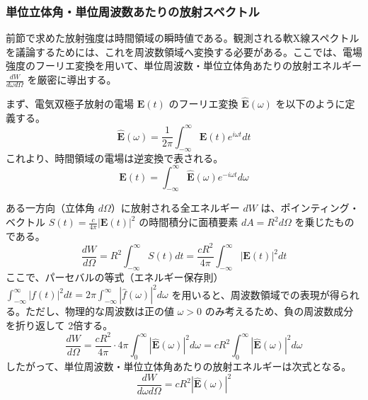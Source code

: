 \documentclass[a4paper,11pt]{bxjsarticle} %
\begin{document}
\subsubsection{単位立体角・単位周波数あたりの放射スペクトル}

前節で求めた放射強度は時間領域の瞬時値である。観測される軟X線スペクトルを議論するためには、これを周波数領域へ変換する必要がある。ここでは、電場強度のフーリエ変換を用いて、単位周波数・単位立体角あたりの放射エネルギー $\frac{dW}{d\omega d\Omega}$ を厳密に導出する。

まず、電気双極子放射の電場 $\bm{E}(t)$ のフーリエ変換 $\hat{\bm{E}}(\omega)$ を以下のように定義する。
\begin{equation}
    \hat{\bm{E}}(\omega) = \frac{1}{2\pi} \int_{-\infty}^{\infty} \bm{E}(t) e^{i\omega t} dt
\end{equation}
これより、時間領域の電場は逆変換で表される。
\begin{equation}
    \bm{E}(t) = \int_{-\infty}^{\infty} \hat{\bm{E}}(\omega) e^{-i\omega t} d\omega
\end{equation}

ある一方向（立体角 $d\Omega$）に放射される全エネルギー $d W$ は、ポインティング・ベクトル $S(t) = \frac{c}{4\pi}|\bm{E}(t)|^2$ の時間積分に面積要素 $dA = R^2 d\Omega$ を乗じたものである。
\begin{equation}
    \frac{dW}{d\Omega} = R^2 \int_{-\infty}^{\infty} S(t) dt = \frac{c R^2}{4\pi} \int_{-\infty}^{\infty} |\bm{E}(t)|^2 dt
\end{equation}
ここで、パーセバルの等式（エネルギー保存則） $\int_{-\infty}^{\infty} |f(t)|^2 dt = 2\pi \int_{-\infty}^{\infty} |\hat{f}(\omega)|^2 d\omega$ を用いると、周波数領域での表現が得られる。ただし、物理的な周波数は正の値 $\omega > 0$ のみ考えるため、負の周波数成分を折り返して 2倍する。
\begin{equation}
    \frac{dW}{d\Omega} = \frac{c R^2}{4\pi} \cdot 4\pi \int_{0}^{\infty} |\hat{\bm{E}}(\omega)|^2 d\omega = c R^2 \int_{0}^{\infty} |\hat{\bm{E}}(\omega)|^2 d\omega
\end{equation}
したがって、単位周波数・単位立体角あたりの放射エネルギーは次式となる。
\begin{equation}
    \frac{dW}{d\omega d\Omega} = c R^2 |\hat{\bm{E}}(\omega)|^2
\end{equation}
\end{document}
